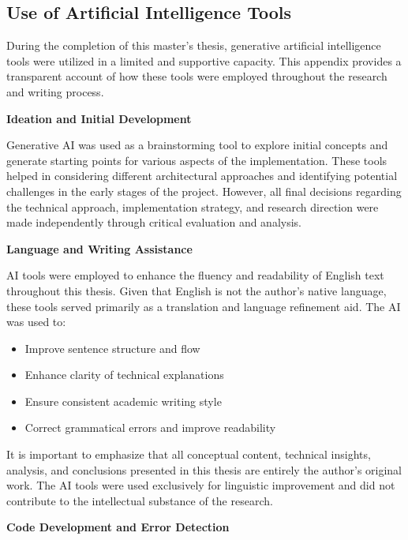 \begin{appendices}
\section*{Use of Artificial Intelligence Tools}

During the completion of this master's thesis, generative artificial intelligence tools were utilized in a limited and supportive capacity. This appendix provides a transparent account of how these tools were employed throughout the research and writing process.

\textbf{Ideation and Initial Development}

Generative AI was used as a brainstorming tool to explore initial concepts and generate starting points for various aspects of the implementation. These tools helped in considering different architectural approaches and identifying potential challenges in the early stages of the project. However, all final decisions regarding the technical approach, implementation strategy, and research direction were made independently through critical evaluation and analysis.

\textbf{Language and Writing Assistance}

AI tools were employed to enhance the fluency and readability of English text throughout this thesis. Given that English is not the author's native language, these tools served primarily as a translation and language refinement aid. The AI was used to:

\begin{itemize}
    \item Improve sentence structure and flow
    \item Enhance clarity of technical explanations  
    \item Ensure consistent academic writing style
    \item Correct grammatical errors and improve readability
\end{itemize}

It is important to emphasize that all conceptual content, technical insights, analysis, and conclusions presented in this thesis are entirely the author's original work. The AI tools were used exclusively for linguistic improvement and did not contribute to the intellectual substance of the research.

\textbf{Code Development and Error Detection}


\end{appendices}
